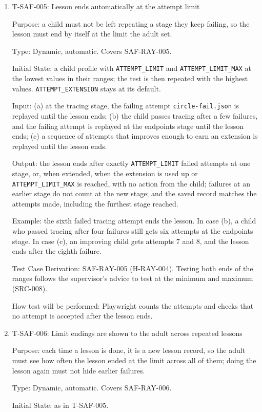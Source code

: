 \documentclass[12pt, titlepage]{article}
\newcommand{\testitem}[1]{\item #1\par\nopagebreak}
\begin{document}
\begin{enumerate}
\testitem{T-SAF-005: Lesson ends automatically at the attempt limit}

Purpose: a child must not be left repeating a stage they keep failing, so
the lesson must end by itself at the limit the adult set.

Type: Dynamic, automatic. Covers SAF-RAY-005.

Initial State: a child profile with \texttt{ATTEMPT\_LIMIT} and
\texttt{ATTEMPT\_\allowbreak LIMIT\_\allowbreak MAX} at the lowest values in their ranges; the test
is then repeated with the highest values. \texttt{ATTEMPT\_EXTENSION} stays at
its default.

Input: (a) at the tracing stage, the failing attempt
\texttt{circle-\allowbreak{}fail.json} is replayed until the lesson ends; (b)
the child passes tracing after a few failures, and the failing attempt is
replayed at the endpoints stage until the lesson ends; (c) a sequence of
attempts that improves enough to earn an extension is replayed until the
lesson ends.

Output: the lesson ends after exactly \texttt{ATTEMPT\_LIMIT} failed
attempts at one stage, or, when extended, when the extension is used up or
\texttt{ATTEMPT\_LIMIT\_MAX} is reached, with no action from the child;
failures at an earlier stage do not count at the new
stage; and the saved record matches the attempts made, including the
furthest stage reached.

Example: the sixth failed tracing attempt ends the lesson. In case (b), a
child who passed tracing after four failures still gets six attempts at the
endpoints stage. In case (c), an improving child gets attempts 7 and 8, and
the lesson ends after the eighth failure.

Test Case Derivation: SAF-RAY-005 (H-RAY-004). Testing both ends of the
ranges follows the supervisor's advice to test at the minimum and maximum
(SRC-008).

How test will be performed: Playwright counts the attempts and checks that
no attempt is accepted after the lesson ends.

\testitem{T-SAF-006: Limit endings are shown to the adult across repeated lessons}

Purpose: each time a lesson is done, it is a new lesson record, so the adult
must see how often the lesson ended at the limit across all of them; doing
the lesson again must not hide earlier failures.

Type: Dynamic, automatic. Covers SAF-RAY-006.

Initial State: as in T-SAF-005.


\end{enumerate}
\end{document}
